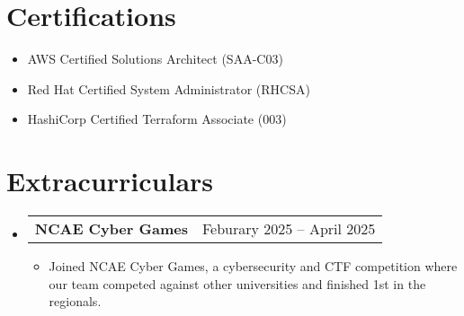 \documentclass[letterpaper,11pt]{article}
\makeatletter
\newcommand{\resumeItem}[1]{
  \item\small{
    {#1 \vspace{-2pt}}
  }
}
\newcommand{\resumeProjectHeading}[2]{
    \item
    \begin{tabular*}{0.97\textwidth}{l@{\extracolsep{\fill}}r}
      \small#1 & #2 \\
    \end{tabular*}\vspace{-7pt}
}
\newcommand{\resumeSubHeadingListStart}{\begin{itemize}[leftmargin=0.08in, label={}]}
\newcommand{\resumeSubHeadingListEnd}{\end{itemize}}
\newcommand{\resumeItemListStart}{\begin{itemize}[leftmargin=0.22in]}
\newcommand{\resumeItemListEnd}{\end{itemize}\vspace{-5pt}}
\makeatother
\begin{document}
\section{Certifications}
    \vspace{-15pt} %
    \vspace{1pt}
    \begin{multicols}{1}
        \begin{itemize}[itemsep=-1pt, parsep=3pt, leftmargin=0.22in]
        \small
            \item AWS Certified Solutions Architect (SAA-C03)
            \item Red Hat Certified System Administrator (RHCSA)
            \item HashiCorp Certified Terraform Associate (003)
        \end{itemize}
    \end{multicols}

\section{Extracurriculars}
  \resumeSubHeadingListStart
    \vspace{-2pt}
    \resumeProjectHeading
      {\textbf{NCAE Cyber Games}}{Feburary 2025 -- April 2025}
      \resumeItemListStart
        \resumeItem{Joined NCAE Cyber Games, a cybersecurity and CTF competition where our team competed against other universities and finished 1st in the regionals.}
      \resumeItemListEnd
      
  \resumeSubHeadingListEnd


\end{document}
